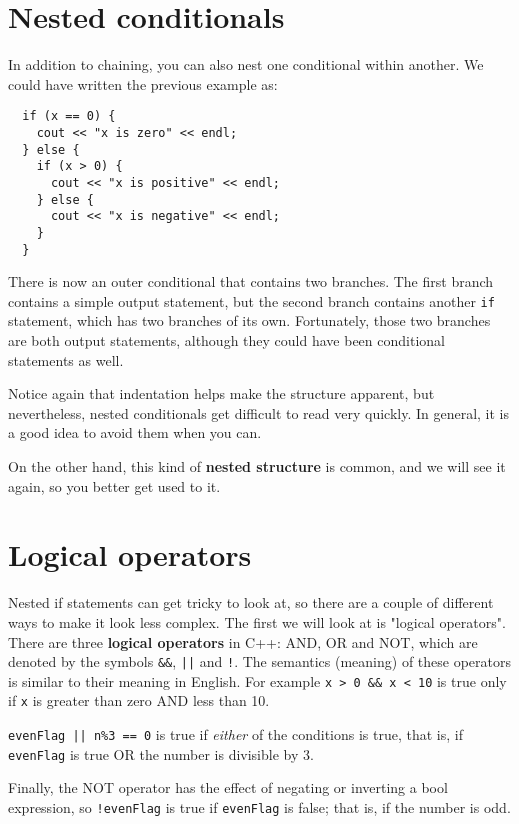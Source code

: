 \section{Nested conditionals}

In addition to chaining, you can also nest one conditional
within another.  We could have written the previous example
as:

\begin{verbatim}
  if (x == 0) {
    cout << "x is zero" << endl;
  } else {
    if (x > 0) {
      cout << "x is positive" << endl;
    } else {
      cout << "x is negative" << endl;
    }
  }
\end{verbatim}
%
There is now an outer conditional that contains two branches.  The
first branch contains a simple output statement, but the second
branch contains another {\tt if} statement, which has two branches
of its own.  Fortunately, those two branches are both output
statements, although they could have been conditional statements as
well.

Notice again that indentation helps make the structure
apparent, but nevertheless, nested conditionals get difficult to read
very quickly.  In general, it is a good idea to avoid them when you
can.


On the other hand, this kind of {\bf nested structure} is common, and
we will see it again, so you better get used to it.

\section{Logical operators}
Nested if statements can get tricky to look at, so there are a couple of different ways to make it look less complex. The first we will look at is "logical operators".
There are three {\bf logical operators} in C++: AND, OR and NOT,
which are denoted by the symbols {\tt \&\&}, {\tt ||} and
{\tt !}.  The semantics (meaning) of these operators is similar
to their meaning in English.  For example {\tt x > 0 \&\& x < 10}
is true only if {\tt x} is greater than zero AND less than 10.


{\tt evenFlag || n\%3 == 0} is true if {\em either} of
the conditions is true, that is, if {\tt evenFlag} is true OR the
number is divisible by 3.

Finally, the NOT operator has the effect of negating or
inverting a bool expression, so {\tt !evenFlag} is true
if {\tt evenFlag} is false; that is, if the number is odd.

